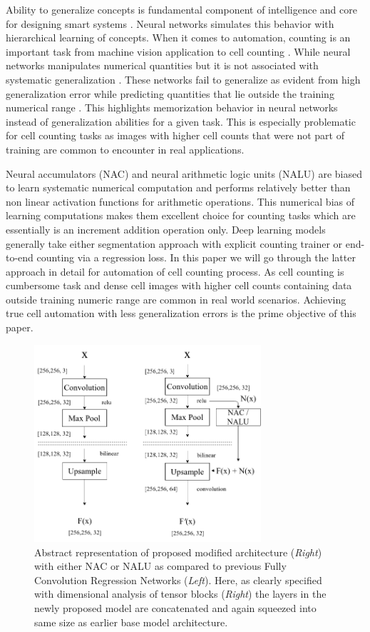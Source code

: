 \documentclass[runningheads]{llncs}
\begin{document}
Ability to generalize concepts is fundamental component of intelligence and core for designing
smart systems \cite{b1, b2}. Neural networks simulates this behavior with hierarchical learning of concepts. When it comes to automation, counting is an important task from machine vision application \cite{b3} to cell counting \cite{b4}. While neural networks manipulates numerical quantities but it is not associated with systematic generalization \cite{b5, b6}. These networks fail to generalize as evident from high generalization error while predicting quantities that lie outside the training numerical range \cite{b7}. This highlights memorization behavior in neural networks instead of generalization abilities for a given task. This is especially problematic for cell counting tasks as images with higher cell counts that were not part of training are common to encounter in real applications.

Neural accumulators (NAC) and neural arithmetic logic units (NALU) \cite{b7} are biased to learn
systematic numerical computation and performs relatively better than non linear activation functions for arithmetic operations. This numerical bias of learning computations makes
them excellent choice for counting tasks which are essentially is an increment addition operation
only. Deep learning models generally take either segmentation approach with explicit counting trainer or end-to-end counting via a regression loss. In this paper we will go through the
latter approach \cite{b4} in detail for automation of cell counting process. As cell counting is cumbersome task and dense cell images with higher cell counts containing data outside training numeric range are common in real world scenarios. Achieving true cell automation with less generalization errors is the prime objective of this paper.

\begin{figure}[!h]
\centering
\includegraphics[width=0.75\textwidth]{abstract-rep.png}
\caption{Abstract representation of proposed modified architecture (\textit{Right}) with either NAC or NALU as compared to previous Fully Convolution Regression Networks (\textit{Left}). Here, as clearly specified with dimensional analysis of tensor blocks (\textit{Right}) the layers in the newly proposed model are concatenated and again squeezed into same size as earlier base model architecture.}
\label{fig1}
\end{figure}
\end{document}
